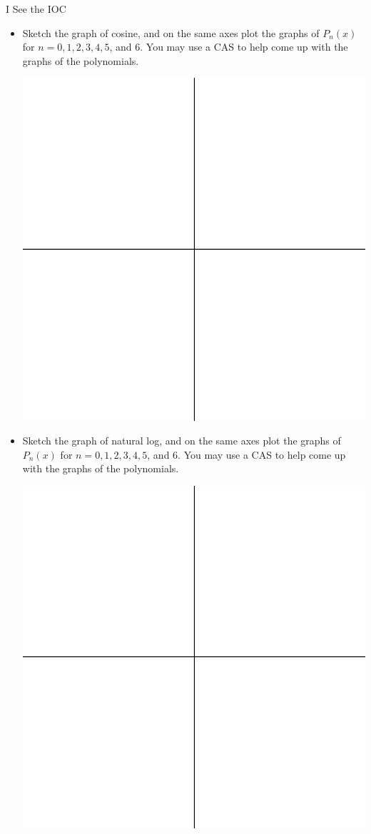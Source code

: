 \begin{exercise}{I See the IOC \Coffeecup \Coffeecup}
\begin{itemize}
\item Sketch the graph of cosine, and on the same axes plot the graphs of $P_n(x)$ for $n=0,1,2,3,4,5$, and 6.  You may use a CAS to help come up with the graphs of the polynomials.
\begin{center}
\includegraphics[scale=0.7]{quadall}
\end{center}
\item Sketch the graph of natural log, and on the same axes plot the graphs of $P_n(x)$ for $n=0,1,2,3,4,5$, and 6.  You may use a CAS to help come up with the graphs of the polynomials.
\begin{center}
\includegraphics[scale=0.7]{quadall}

\end{center}
\end{itemize}
\end{exercise}
